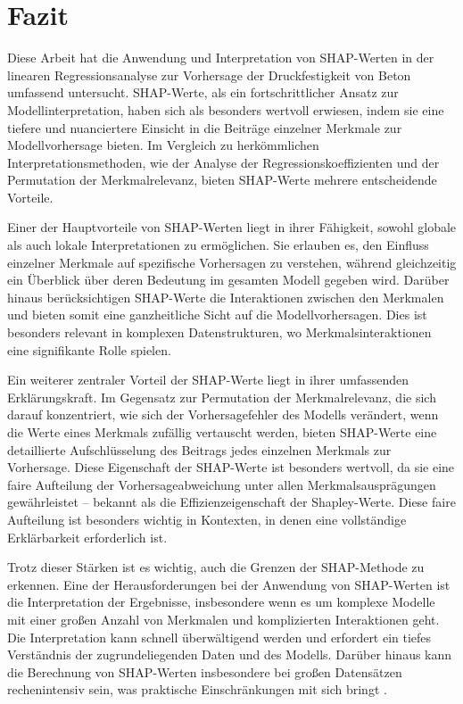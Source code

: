 \chapter{Fazit}

Diese Arbeit hat die Anwendung und Interpretation von SHAP-Werten in der 
linearen Regressionsanalyse zur Vorhersage der Druckfestigkeit von Beton umfassend untersucht. 
SHAP-Werte, als ein fortschrittlicher Ansatz zur Modellinterpretation, haben sich als besonders 
wertvoll erwiesen, indem sie eine tiefere und nuanciertere Einsicht in die Beiträge einzelner 
Merkmale zur Modellvorhersage bieten. Im Vergleich zu herkömmlichen Interpretationsmethoden, 
wie der Analyse der Regressionskoeffizienten und der Permutation der Merkmalrelevanz, 
bieten SHAP-Werte mehrere entscheidende Vorteile.

Einer der Hauptvorteile von SHAP-Werten liegt in ihrer Fähigkeit, sowohl globale als auch 
lokale Interpretationen zu ermöglichen. Sie erlauben es, den Einfluss einzelner Merkmale auf 
spezifische Vorhersagen zu verstehen, während gleichzeitig ein Überblick über deren Bedeutung 
im gesamten Modell gegeben wird. Darüber hinaus berücksichtigen SHAP-Werte die Interaktionen 
zwischen den Merkmalen und bieten somit eine ganzheitliche Sicht auf die Modellvorhersagen. 
Dies ist besonders relevant in komplexen Datenstrukturen, wo Merkmalsinteraktionen eine signifikante
Rolle spielen.

Ein weiterer zentraler Vorteil der SHAP-Werte liegt in ihrer umfassenden Erklärungskraft.
Im Gegensatz zur Permutation der Merkmalrelevanz, die sich darauf konzentriert, wie sich der 
Vorhersagefehler des Modells verändert, wenn die Werte eines Merkmals zufällig vertauscht werden, 
bieten SHAP-Werte eine detaillierte Aufschlüsselung des Beitrags jedes einzelnen Merkmals zur 
Vorhersage. Diese Eigenschaft der SHAP-Werte ist besonders wertvoll, da sie eine faire 
Aufteilung der Vorhersageabweichung unter allen Merkmalsausprägungen gewährleistet – bekannt 
als die Effizienzeigenschaft der Shapley-Werte. Diese faire Aufteilung ist besonders wichtig 
in Kontexten, in denen eine vollständige Erklärbarkeit erforderlich ist.

Trotz dieser Stärken ist es wichtig, auch die Grenzen der SHAP-Methode zu erkennen. 
Eine der Herausforderungen bei der Anwendung von SHAP-Werten ist die Interpretation der Ergebnisse, 
insbesondere wenn es um komplexe Modelle mit einer großen Anzahl von Merkmalen und komplizierten 
Interaktionen geht. Die Interpretation kann schnell überwältigend werden und erfordert ein tiefes 
Verständnis der zugrundeliegenden Daten und des Modells. Darüber hinaus kann die Berechnung von 
SHAP-Werten insbesondere bei großen Datensätzen rechenintensiv sein, was praktische Einschränkungen 
mit sich bringt \cite[S. 224]{Molnar_2022}.

